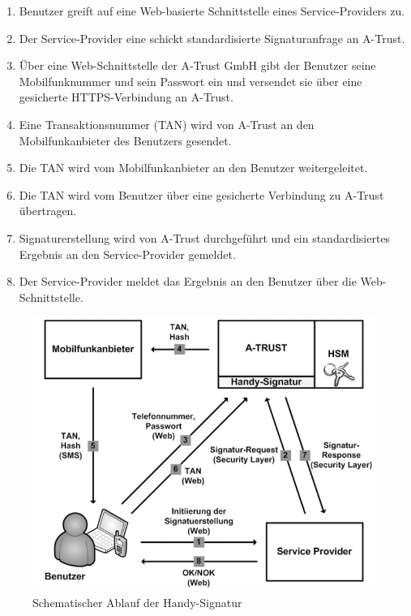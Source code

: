 \documentclass[11pt,a4paper,ngerman]{scrreprt}
\begin{document}
\begin{enumerate}
    \item Benutzer greift auf eine Web-basierte Schnittstelle eines Service-Providers zu.
    \item Der Service-Provider eine schickt standardisierte Signaturanfrage an A-Trust.
    \item Über eine Web-Schnittstelle der A-Trust GmbH gibt der Benutzer seine Mobilfunknummer und sein Passwort ein und versendet sie über eine gesicherte HTTPS-Verbindung an A-Trust.
    \item Eine Transaktionsnummer (TAN) wird von A-Trust an den Mobilfunkanbieter des Benutzers gesendet.
    \item Die TAN wird vom Mobilfunkanbieter an den Benutzer weitergeleitet.
    \item Die TAN wird vom Benutzer über eine gesicherte Verbindung zu A-Trust übertragen.
    \item Signaturerstellung wird von A-Trust durchgeführt und ein standardisiertes Ergebnis an den Service-Provider gemeldet.
    \item Der Service-Provider meldet das Ergebnis an den Benutzer über die Web-Schnittstelle.
\end{enumerate}
\begin{figure}[htbp]
    \centering
        \includegraphics[width=\textwidth]{Abbildungen/Ablauf_Handy-Signatur.png}
    \caption{Schematischer Ablauf der Handy-Signatur \cite[S.~3]{mobQes}}
    \label{fig:HandySignaturablauf}
\end{figure}
\end{document}
